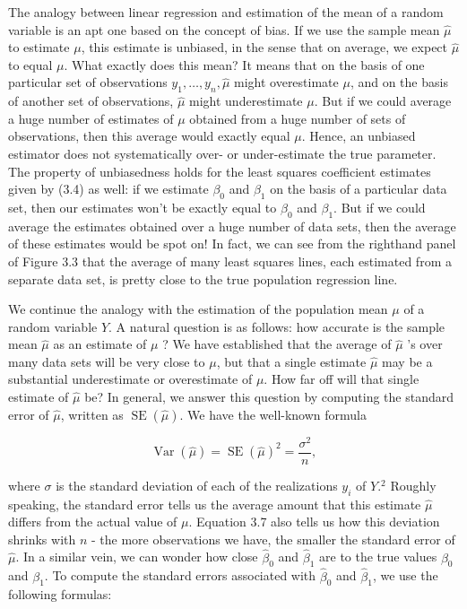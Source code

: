 \documentclass[10pt]{article}
\begin{document}
The analogy between linear regression and estimation of the mean of a random variable is an apt one based on the concept of bias. If we use the sample mean $\hat{\mu}$ to estimate $\mu$, this estimate is unbiased, in the sense that on average, we expect $\hat{\mu}$ to equal $\mu$. What exactly does this mean? It means that on the basis of one particular set of observations $y_{1}, \ldots, y_{n}, \hat{\mu}$ might overestimate $\mu$, and on the basis of another set of observations, $\hat{\mu}$ might underestimate $\mu$. But if we could average a huge number of estimates of $\mu$ obtained from a huge number of sets of observations, then this average would exactly equal $\mu$. Hence, an unbiased estimator does not systematically over- or under-estimate the true parameter. The property of unbiasedness holds for the least squares coefficient estimates given by (3.4) as well: if we estimate $\beta_{0}$ and $\beta_{1}$ on the basis of a particular data set, then our estimates won't be exactly equal to $\beta_{0}$ and $\beta_{1}$. But if we could average the estimates obtained over a huge number of data sets, then the average of these estimates would be spot on! In fact, we can see from the righthand panel of Figure 3.3 that the average of many least squares lines, each estimated from a separate data set, is pretty close to the true population regression line.

We continue the analogy with the estimation of the population mean $\mu$ of a random variable $Y$. A natural question is as follows: how accurate is the sample mean $\hat{\mu}$ as an estimate of $\mu$ ? We have established that the average of $\hat{\mu}$ 's over many data sets will be very close to $\mu$, but that a single estimate $\hat{\mu}$ may be a substantial underestimate or overestimate of $\mu$. How far off will that single estimate of $\hat{\mu}$ be? In general, we answer this question by computing the standard error of $\hat{\mu}$, written as $\operatorname{SE}(\hat{\mu})$. We have the well-known formula


\begin{equation*}
\operatorname{Var}(\hat{\mu})=\operatorname{SE}(\hat{\mu})^{2}=\frac{\sigma^{2}}{n}, \tag{3.7}
\end{equation*}


where $\sigma$ is the standard deviation of each of the realizations $y_{i}$ of $Y .{ }^{2}$ Roughly speaking, the standard error tells us the average amount that this estimate $\hat{\mu}$ differs from the actual value of $\mu$. Equation 3.7 also tells us how this deviation shrinks with $n$ - the more observations we have, the smaller the standard error of $\hat{\mu}$. In a similar vein, we can wonder how close $\hat{\beta}_{0}$ and $\hat{\beta}_{1}$ are to the true values $\beta_{0}$ and $\beta_{1}$. To compute the standard errors associated with $\hat{\beta}_{0}$ and $\hat{\beta}_{1}$, we use the following formulas:
\end{document}
